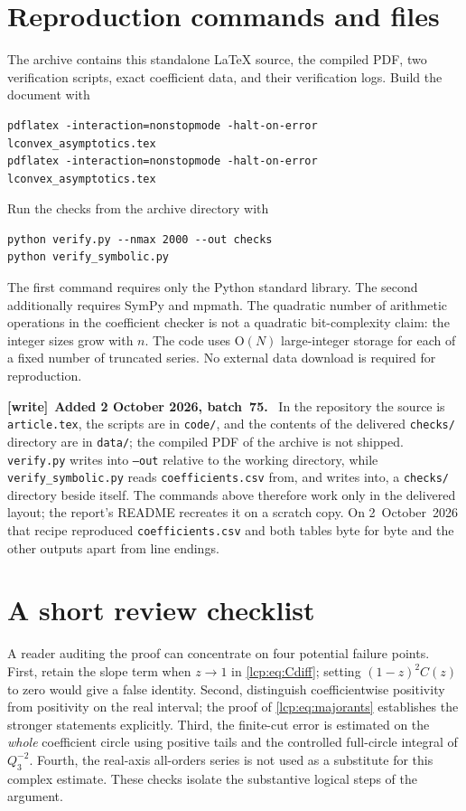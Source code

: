 \documentclass[11pt]{article}
\numberwithin{equation}{section}
\theoremstyle{definition}\newtheorem{definition}[theorem]{Definition}
\theoremstyle{remark}\newtheorem{remark}[theorem]{Remark}
\newcommand{\OO}{\mathrm O}
\newenvironment{writenote}[1][]{\par\smallskip\begingroup\small
 \noindent\textbf{[write]}\if\relax\detokenize{#1}\relax\else~\textbf{#1.}\fi\ }%
 {\par\endgroup\smallskip}
\begin{document}
\appendix
\section{Reproduction commands and files}
The archive contains this standalone \LaTeX{} source, the compiled PDF,
two verification scripts, exact coefficient data, and their verification
logs. Build the document with
\begin{verbatim}
pdflatex -interaction=nonstopmode -halt-on-error lconvex_asymptotics.tex
pdflatex -interaction=nonstopmode -halt-on-error lconvex_asymptotics.tex
\end{verbatim}
Run the checks from the archive directory with
\begin{verbatim}
python verify.py --nmax 2000 --out checks
python verify_symbolic.py
\end{verbatim}
The first command requires only the Python standard library.
The second additionally requires SymPy and mpmath.
The quadratic number of arithmetic operations in the coefficient checker
is not a quadratic bit-complexity claim: the integer sizes grow with $n$.
The code uses $\OO(N)$ large-integer storage for each of a fixed number of
truncated series. No external data download is required for reproduction.

\begin{writenote}[Added 2 October 2026, batch~75]
In the repository the source is \texttt{article.tex}, the scripts are in
\texttt{code/}, and the contents of the delivered \texttt{checks/}
directory are in \texttt{data/}; the compiled PDF of the archive is not
shipped. \texttt{verify.py} writes into \texttt{--out} relative to the
working directory, while \texttt{verify\_symbolic.py} reads
\texttt{coefficients.csv} from, and writes into, a \texttt{checks/}
directory beside itself. The commands above therefore work only in the
delivered layout; the report's README recreates it on a scratch copy. On
2~October~2026 that recipe reproduced \texttt{coefficients.csv} and both
tables byte for byte and the other outputs apart from line endings.
\end{writenote}

\section{A short review checklist}
A reader auditing the proof can concentrate on four potential failure
points. First, retain the slope term when $z\to1$ in
\eqref{lcp:eq:Cdiff}; setting $(1-z)^2C(z)$ to zero would give a false
identity. Second, distinguish coefficientwise positivity from positivity
on the real interval; the proof of \eqref{lcp:eq:majorants} establishes the
stronger statements explicitly. Third, the finite-cut error is estimated
on the \emph{whole} coefficient circle using positive tails and the
controlled full-circle integral of $Q_3^{-2}$. Fourth, the real-axis all-orders
series is not used as a substitute for this complex estimate.
These checks isolate the substantive logical steps of the argument.
\end{document}
